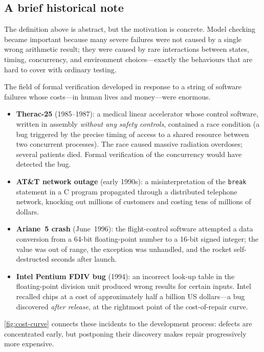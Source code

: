 \subsection{A brief historical note}

The definition above is abstract, but the motivation is concrete.  Model
checking became important because many severe failures were not caused by a
single wrong arithmetic result; they were caused by rare interactions between
states, timing, concurrency, and environment choices---exactly the behaviours
that are hard to cover with ordinary testing.

The field of formal verification developed in response to a string of
software failures whose costs---in human lives and money---were enormous.

\begin{itemize}
  \item \textbf{Therac-25} (1985--1987): a medical linear accelerator whose
        control software, written in assembly \emph{without any safety
        controls}, contained a race condition (a bug triggered by the precise
        timing of access to a shared resource between two concurrent
        processes).  The race caused massive radiation overdoses; several
        patients died.  Formal verification of the concurrency would have
        detected the bug.
  \item \textbf{AT\&T network outage} (early 1990s): a misinterpretation
        of the \texttt{break} statement in a C program propagated through a
        distributed telephone network, knocking out millions of customers and
        costing tens of millions of dollars.
  \item \textbf{Ariane~5 crash} (June~1996): the flight-control software
        attempted a data conversion from a 64-bit floating-point number to a
        16-bit signed integer; the value was out of range, the exception was
        unhandled, and the rocket self-destructed seconds after launch.
  \item \textbf{Intel Pentium FDIV bug} (1994): an incorrect look-up table in
        the floating-point division unit produced wrong results for certain
        inputs.  Intel recalled chips at a cost of approximately half a
        billion US dollars---a bug discovered \emph{after release}, at the
        rightmost point of the cost-of-repair curve.
\end{itemize}

\cref{fig:cost-curve} connects these incidents to the development process:
defects are concentrated early, but postponing their discovery makes repair
progressively more expensive.

